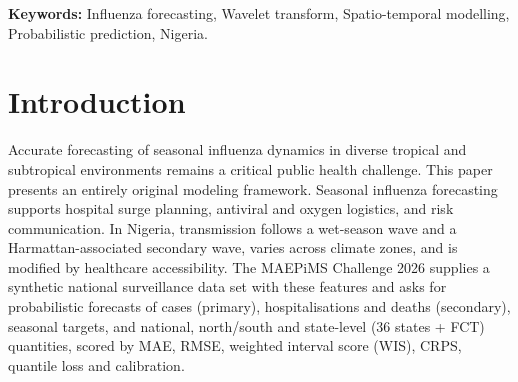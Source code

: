 \documentclass[11pt,a4paper]{article}
\begin{document}
%

\noindent\textbf{Keywords:}  Influenza forecasting, Wavelet transform, Spatio-temporal modelling, Probabilistic prediction, Nigeria.


\section{Introduction}
Accurate forecasting of seasonal influenza dynamics in diverse tropical and subtropical
environments remains a critical public health challenge. This paper presents an entirely
original modeling framework. Seasonal influenza forecasting supports hospital surge planning, antiviral and oxygen logistics, and risk communication. In Nigeria, transmission follows a wet-season wave and a Harmattan-associated secondary wave, varies across climate zones, and is modified by healthcare accessibility. The MAEPiMS Challenge 2026 supplies a synthetic national surveillance data set with these features and asks for probabilistic forecasts of cases (primary), hospitalisations and deaths (secondary), seasonal targets, and national, north/south and state-level (36 states + FCT) quantities, scored by MAE, RMSE, weighted interval score (WIS), CRPS, quantile loss and calibration.
\end{document}
